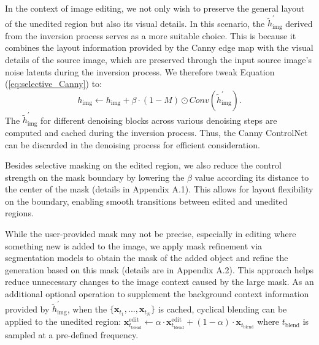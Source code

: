 \documentclass{article}
\newenvironment{cyanpar}{\color{cyan}}{}
\begin{document}
In the context of image editing, we not only wish to preserve the general layout of the unedited region but also its visual details. In this scenario, the $\tilde{h}^{\prime}_{\text{img}}$ derived from the inversion process serves as a more suitable choice. This is because it combines the layout information provided by the Canny edge map with the visual details of the source image, which are preserved through the input source image's noise latents during the inversion process. We therefore tweak Equation (\ref{eq:selective_Canny}) to:
\begin{equation}
h_{\text{img}} \leftarrow h_{\text{img}} + \beta\cdot (1-M) \odot Conv(\tilde{h}^{\prime}_{\text{img}}).
\label{eq:selective_Canny2}
\end{equation}
The $\tilde{h}^{\prime}_{\text{img}}$ for different denoising blocks across various denoising steps are computed and cached during the inversion process. Thus, the Canny ControlNet can be discarded in the denoising process for efficient consideration.

\begin{cyanpar}
Besides selective masking on the edited region, we also reduce the control strength on the mask boundary by lowering the $\beta$ value according its distance to the center of the mask (details in Appendix A.1). This allows for layout flexibility on the boundary, enabling smooth transitions between edited and unedited regions.  

While the user-provided mask may not be precise, especially in editing where something new is added to the image, we apply mask refinement via segmentation models \citep{kirillov2023segment,ravi2024sam,medeiros2024langsegmentanything} to obtain the mask of the added object and refine the generation based on this mask (details are in Appendix A.2). This approach helps reduce unnecessary changes to the image context caused by the large mask. As an additional optional operation to supplement the background context information provided by $\tilde{h}^{\prime}_{\text{img}}$, when the $\{\mathbf{x}_{t_{1}},...,\mathbf{x}_{t_{N}}\}$ is cached, cyclical blending can be applied to the unedited region:  $\mathbf{x}^\text{edit}_{t_\text{blend}}\leftarrow \alpha\cdot\mathbf{x}^\text{edit}_{t_\text{blend}}+(1-\alpha)\cdot\mathbf{x}_{t_\text{blend}}$ where $t_\text{blend}$ is sampled at a pre-defined frequency.



\end{cyanpar}
\end{document}
